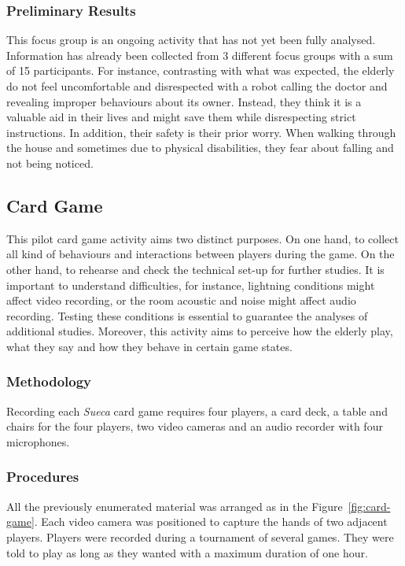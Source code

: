 \subsubsection{Preliminary Results}

This focus group is an ongoing activity that has not yet been fully analysed.
Information has already been collected from 3 different focus groups with a sum of 15 participants.
For instance, contrasting with what was expected, the elderly do not feel uncomfortable and disrespected with a robot calling the doctor and revealing improper behaviours about its owner.
Instead, they think it is a valuable aid in their lives and might save them while disrespecting strict instructions.
In addition, their safety is their prior worry.
When walking through the house and sometimes due to physical disabilities, they fear about falling and not being noticed.







\subsection{Card Game}
This pilot card game activity aims two distinct purposes.
On one hand, to collect all kind of behaviours and interactions between players during the game.
On the other hand, to rehearse and check the technical set-up for further studies.
It is important to understand difficulties, for instance, lightning conditions might affect video recording, or the room acoustic and noise might affect audio recording.
Testing these conditions is essential to guarantee the analyses of additional studies.
Moreover, this activity aims to perceive how the elderly play, what they say and how they behave in certain game states.

\subsubsection{Methodology}
Recording each \emph{Sueca} card game requires four players, a card deck, a table and chairs for the four players, two video cameras and an audio recorder with four microphones.

\subsubsection{Procedures}
All the previously enumerated material was arranged as in the Figure~\ref{fig:card-game}.
Each video camera was positioned to capture the hands of two adjacent players.
Players were recorded during a tournament of several games.
They were told to play as long as they wanted with a maximum duration of one hour.

